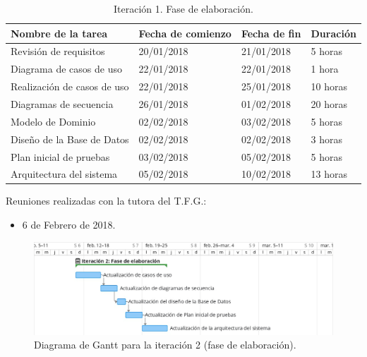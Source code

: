 \documentclass[twoside]{report}
\begin{document}
\begin{table}[H]
\centering
\begin{tabular}{|l|l|l|l|}
\hline
Nombre de la tarea          & Fecha de comienzo & Fecha de fin & Duración \\ \hline
Revisión de requisitos      & 20/01/2018        & 21/01/2018   & 5 horas   \\ \hline
Diagrama de casos de uso    & 22/01/2018        & 22/01/2018   & 1 hora   \\ \hline
Realización de casos de uso & 22/01/2018        & 25/01/2018   & 10 horas  \\ \hline
Diagramas de secuencia      & 26/01/2018        & 01/02/2018   & 20 horas  \\ \hline
Modelo de Dominio 			& 02/02/2018        & 03/02/2018   & 5 horas    \\ \hline
Diseño de la Base de Datos  & 02/02/2018        & 02/02/2018   & 3 horas   \\ \hline
Plan inicial de pruebas     & 03/02/2018        & 05/02/2018   & 5 horas   \\ \hline
Arquitectura del sistema    & 05/02/2018        & 10/02/2018   & 13 horas   \\ \hline
\end{tabular}
\caption{Iteración 1. Fase de elaboración.}
\end{table}

Reuniones realizadas con la tutora del T.F.G.:
\begin{itemize}
\item 6 de Febrero de 2018.
\end{itemize}


\begin{figure}[H]
\begin{center}
\includegraphics[width=\textwidth]{images/gantt/ite2}
\caption{Diagrama de Gantt para la iteración 2 (fase de elaboración).}
\end{center}
\end{figure}
\end{document}
